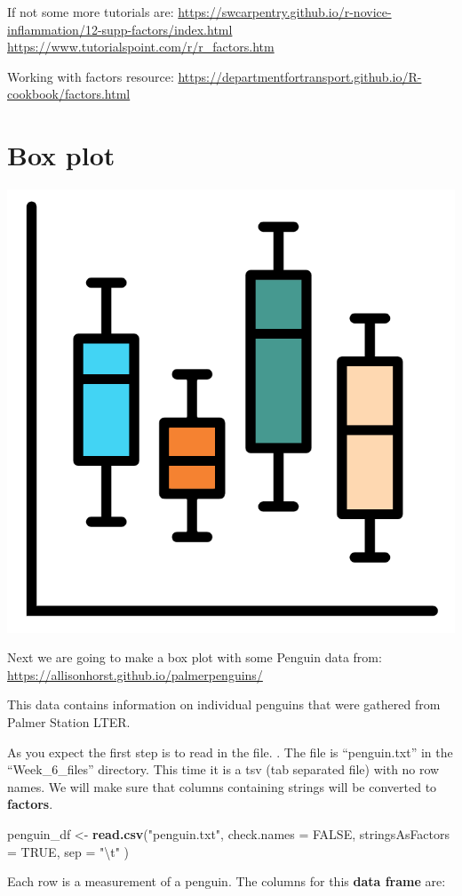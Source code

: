 \documentclass[]{book}
\newenvironment{Shaded}{\begin{snugshade}}{\end{snugshade}}
\newcommand{\KeywordTok}[1]{\textcolor[rgb]{0.13,0.29,0.53}{\textbf{#1}}}
\newcommand{\DataTypeTok}[1]{\textcolor[rgb]{0.13,0.29,0.53}{#1}}
\newcommand{\CharTok}[1]{\textcolor[rgb]{0.31,0.60,0.02}{#1}}
\newcommand{\StringTok}[1]{\textcolor[rgb]{0.31,0.60,0.02}{#1}}
\newcommand{\OtherTok}[1]{\textcolor[rgb]{0.56,0.35,0.01}{#1}}
\newcommand{\NormalTok}[1]{#1}
\begin{document}
If not some more tutorials are:
\url{https://swcarpentry.github.io/r-novice-inflammation/12-supp-factors/index.html}
\url{https://www.tutorialspoint.com/r/r_factors.htm}

Working with factors resource:
\url{https://departmentfortransport.github.io/R-cookbook/factors.html}

\section{Box plot}\label{box-plot}

\begin{center}\includegraphics[width=0.2\linewidth]{figures/boxplot} \end{center}

Next we are going to make a box plot with some Penguin data from:
\url{https://allisonhorst.github.io/palmerpenguins/}

This data contains information on individual penguins that were gathered
from Palmer Station LTER.

As you expect the first step is to read in the file. . The file is
``penguin.txt'' in the ``Week\_6\_files'' directory. This time it is a
tsv (tab separated file) with no row names. We will make sure that
columns containing strings will be converted to \textbf{factors}.

\begin{Shaded}
\begin{Highlighting}[]
\NormalTok{penguin_df <-}\StringTok{ }\KeywordTok{read.csv}\NormalTok{(}\StringTok{"penguin.txt"}\NormalTok{, }
                      \DataTypeTok{check.names =} \OtherTok{FALSE}\NormalTok{,}
                      \DataTypeTok{stringsAsFactors =} \OtherTok{TRUE}\NormalTok{,}
                      \DataTypeTok{sep =} \StringTok{"}\CharTok{\textbackslash{}t}\StringTok{"}
\NormalTok{                      )}
\end{Highlighting}
\end{Shaded}

Each row is a measurement of a penguin. The columns for this
\textbf{data frame} are:
\end{document}
